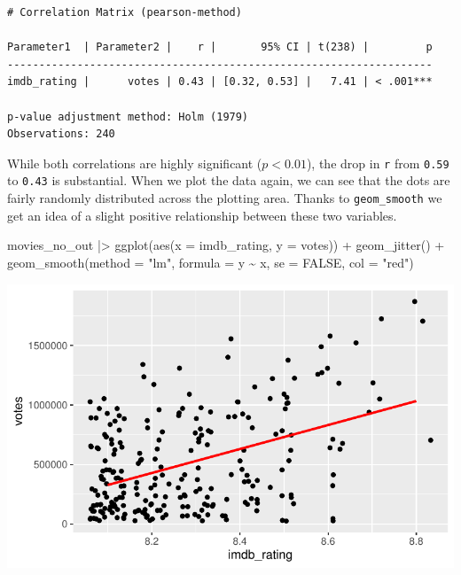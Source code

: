\documentclass[
  letterpaper,
]{krantz}
\makeatletter
\newenvironment{Shaded}{\begin{snugshade}}{\end{snugshade}}
\newcommand{\AttributeTok}[1]{\textcolor[rgb]{0.40,0.45,0.13}{#1}}
\newcommand{\ConstantTok}[1]{\textcolor[rgb]{0.56,0.35,0.01}{#1}}
\newcommand{\FunctionTok}[1]{\textcolor[rgb]{0.28,0.35,0.67}{#1}}
\newcommand{\NormalTok}[1]{\textcolor[rgb]{0.00,0.23,0.31}{#1}}
\newcommand{\SpecialCharTok}[1]{\textcolor[rgb]{0.37,0.37,0.37}{#1}}
\newcommand{\StringTok}[1]{\textcolor[rgb]{0.13,0.47,0.30}{#1}}
\newenvironment{kframe}{%
\medskip{}
\setlength{\fboxsep}{.8em}
 \def\at@end@of@kframe{}%
 \ifinner\ifhmode%
  \def\at@end@of@kframe{\end{minipage}}%
  \begin{minipage}{\columnwidth}%
 \fi\fi%
 \def\FrameCommand##1{\hskip\@totalleftmargin \hskip-\fboxsep
 \colorbox{shadecolor}{##1}\hskip-\fboxsep
     \hskip-\linewidth \hskip-\@totalleftmargin \hskip\columnwidth}%
 \MakeFramed {\advance\hsize-\width
   \@totalleftmargin\z@ \linewidth\hsize
   \@setminipage}}%
 {\par\unskip\endMakeFramed%
 \at@end@of@kframe}
\renewenvironment{Shaded}{\begin{kframe}}{\end{kframe}}
\makeatother
\begin{document}
\begin{verbatim}
# Correlation Matrix (pearson-method)

Parameter1  | Parameter2 |    r |       95% CI | t(238) |         p
-------------------------------------------------------------------
imdb_rating |      votes | 0.43 | [0.32, 0.53] |   7.41 | < .001***

p-value adjustment method: Holm (1979)
Observations: 240
\end{verbatim}

While both correlations are highly significant (\(p < 0.01\)), the drop
in \texttt{r} from \texttt{0.59} to \texttt{0.43} is substantial. When
we plot the data again, we can see that the dots are fairly randomly
distributed across the plotting area. Thanks to \texttt{geom\_smooth} we
get an idea of a slight positive relationship between these two
variables.

\begin{Shaded}
\begin{Highlighting}[]
\NormalTok{movies\_no\_out }\SpecialCharTok{|\textgreater{}}
  \FunctionTok{ggplot}\NormalTok{(}\FunctionTok{aes}\NormalTok{(}\AttributeTok{x =}\NormalTok{ imdb\_rating, }\AttributeTok{y =}\NormalTok{ votes)) }\SpecialCharTok{+}
  \FunctionTok{geom\_jitter}\NormalTok{() }\SpecialCharTok{+}
  \FunctionTok{geom\_smooth}\NormalTok{(}\AttributeTok{method =} \StringTok{"lm"}\NormalTok{,}
              \AttributeTok{formula =}\NormalTok{ y }\SpecialCharTok{\textasciitilde{}}\NormalTok{ x,}
              \AttributeTok{se =} \ConstantTok{FALSE}\NormalTok{,}
              \AttributeTok{col =} \StringTok{"red"}\NormalTok{)}
\end{Highlighting}
\end{Shaded}

\includegraphics{10_correlations_files/figure-pdf/scatterplot-no-outliers-1.pdf}
\end{document}
